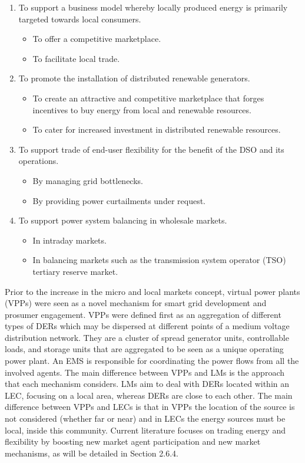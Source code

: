 \begin{enumerate}
\item To support a business model whereby locally produced energy is primarily targeted towards local
consumers.
\begin{itemize}
\item To offer a competitive marketplace.
\item To facilitate local trade.
\end{itemize}
\item To promote the installation of distributed renewable generators.
\begin{itemize}
\item To create an attractive and competitive marketplace that forges incentives to buy energy from local
and renewable resources.
\item To cater for increased investment in distributed renewable resources.
\end{itemize}
\item To support trade of end-user flexibility for the benefit of the DSO and its operations.
\begin{itemize}
\item By managing grid bottlenecks.
\item By providing power curtailments under request.
\end{itemize}
\item To support power system balancing in wholesale markets.
\begin{itemize}
\item In intraday markets.
\item In balancing markets such as the transmission system operator (TSO) tertiary reserve market.
\end{itemize}
\end{enumerate}

Prior to the increase in the micro and local markets concept, virtual power plants (VPPs) were seen as a novel mechanism for smart grid development and prosumer engagement. VPPs were defined first as an aggregation of different types of DERs which may be dispersed at different points of a medium voltage distribution network. They are a cluster of spread generator units, controllable loads, and storage units that are aggregated to be seen as a unique operating power plant. An EMS is responsible for coordinating the power flows from all the involved agents. The main difference between VPPs and LMs is the approach that each mechanism considers. LMs aim to deal with DERs located within an LEC, focusing on a local area, whereas DERs are close to each other. The main difference between VPPs and LECs is that in VPPs the location of the source is not considered (whether far or near) and in LECs the energy sources must be local, inside this community. Current literature focuses on trading energy and flexibility by boosting new market agent participation and new market mechanisms, as will be detailed in Section 2.6.4.

